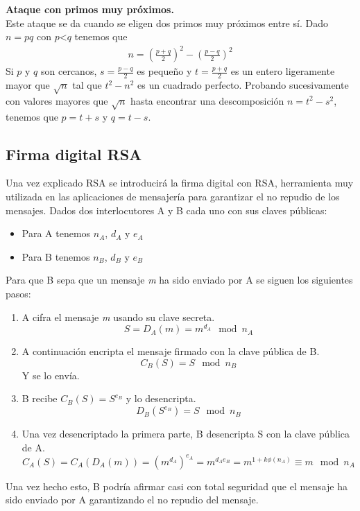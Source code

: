 \begin{description}
	\item \textbf{Ataque con primos muy próximos.}\\
	Este ataque se da cuando se eligen dos primos muy próximos entre sí. Dado $n=pq$ con $p$\textless $q$ tenemos que  
	\begin{align*}
			n=\left (\frac{p+q}{2}\right )^2-\left (\frac{p-q}{2}\right )^2
	\end{align*}
	Si $p$ y $q$ son cercanos, $s=\frac{p-q}{2}$ es pequeño y $t=\frac{p+q}{2}$ es un entero ligeramente mayor que $\sqrt{n}$ tal que $t^2 - n^2$ es un cuadrado perfecto. Probando sucesivamente con valores mayores que $\sqrt{n}$ hasta encontrar una descomposición $n=t^2-s^2$, tenemos que $p=t+s$ y $q=t-s$.
\end{description}

\subsection{Firma digital RSA}
Una vez explicado RSA se introducirá la firma digital con RSA, herramienta muy utilizada en las aplicaciones de mensajería para garantizar el no repudio de los mensajes.
Dados dos interlocutores A y B cada uno con sus claves públicas:
\begin{itemize}
	\item Para A tenemos $n_A$, $d_A$ y $e_A$   
	\item Para B tenemos $n_B$, $d_B$ y $e_B$   
\end{itemize}
Para que B sepa que un mensaje \emph{m} ha sido enviado por A se siguen los siguientes pasos:
\begin{enumerate}
	\item A cifra el mensaje \emph{m} usando su clave secreta.
		$$
			S=D_A(m)=m^{d_A} \mod n_A
		$$
	\item A continuación encripta el mensaje firmado con la clave pública de B.
		$$
			C_B(S)=S\mod n_B
		$$
		Y se lo envía.
	\item B recibe $C_B(S)=S^{e_B}$ y lo desencripta. 
		$$
			D_B(S^{e_B})=S \mod n_B
		$$
	\item Una vez desencriptado la primera parte, B desencripta S con la clave pública de A.
		$$
			C_A(S)=C_A(D_A(m))=(m^{d_A})^{e_A}=m^{d_Ae_B}=m^{1+k\phi(n_A)}\equiv m \mod n_A
		$$
\end{enumerate}
Una vez hecho esto, B podría afirmar casi con total seguridad que el mensaje ha sido enviado por A garantizando el no repudio del mensaje.

